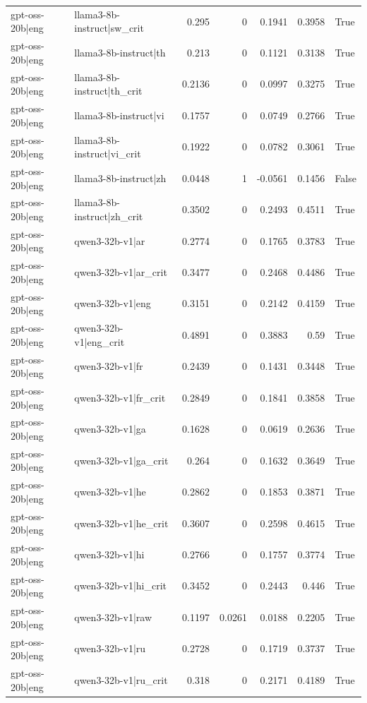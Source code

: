 \begin{table}
\begin{tabular}{l l r r r r l}
gpt-oss-20b|eng & llama3-8b-instruct|sw_crit & 0.295 & 0 & 0.1941 & 0.3958 & True \\
gpt-oss-20b|eng & llama3-8b-instruct|th & 0.213 & 0 & 0.1121 & 0.3138 & True \\
gpt-oss-20b|eng & llama3-8b-instruct|th_crit & 0.2136 & 0 & 0.0997 & 0.3275 & True \\
gpt-oss-20b|eng & llama3-8b-instruct|vi & 0.1757 & 0 & 0.0749 & 0.2766 & True \\
gpt-oss-20b|eng & llama3-8b-instruct|vi_crit & 0.1922 & 0 & 0.0782 & 0.3061 & True \\
gpt-oss-20b|eng & llama3-8b-instruct|zh & 0.0448 & 1 & -0.0561 & 0.1456 & False \\
gpt-oss-20b|eng & llama3-8b-instruct|zh_crit & 0.3502 & 0 & 0.2493 & 0.4511 & True \\
gpt-oss-20b|eng & qwen3-32b-v1|ar & 0.2774 & 0 & 0.1765 & 0.3783 & True \\
gpt-oss-20b|eng & qwen3-32b-v1|ar_crit & 0.3477 & 0 & 0.2468 & 0.4486 & True \\
gpt-oss-20b|eng & qwen3-32b-v1|eng & 0.3151 & 0 & 0.2142 & 0.4159 & True \\
gpt-oss-20b|eng & qwen3-32b-v1|eng_crit & 0.4891 & 0 & 0.3883 & 0.59 & True \\
gpt-oss-20b|eng & qwen3-32b-v1|fr & 0.2439 & 0 & 0.1431 & 0.3448 & True \\
gpt-oss-20b|eng & qwen3-32b-v1|fr_crit & 0.2849 & 0 & 0.1841 & 0.3858 & True \\
gpt-oss-20b|eng & qwen3-32b-v1|ga & 0.1628 & 0 & 0.0619 & 0.2636 & True \\
gpt-oss-20b|eng & qwen3-32b-v1|ga_crit & 0.264 & 0 & 0.1632 & 0.3649 & True \\
gpt-oss-20b|eng & qwen3-32b-v1|he & 0.2862 & 0 & 0.1853 & 0.3871 & True \\
gpt-oss-20b|eng & qwen3-32b-v1|he_crit & 0.3607 & 0 & 0.2598 & 0.4615 & True \\
gpt-oss-20b|eng & qwen3-32b-v1|hi & 0.2766 & 0 & 0.1757 & 0.3774 & True \\
gpt-oss-20b|eng & qwen3-32b-v1|hi_crit & 0.3452 & 0 & 0.2443 & 0.446 & True \\
gpt-oss-20b|eng & qwen3-32b-v1|raw & 0.1197 & 0.0261 & 0.0188 & 0.2205 & True \\
gpt-oss-20b|eng & qwen3-32b-v1|ru & 0.2728 & 0 & 0.1719 & 0.3737 & True \\
gpt-oss-20b|eng & qwen3-32b-v1|ru_crit & 0.318 & 0 & 0.2171 & 0.4189 & True \\

\end{tabular}
\end{table}
